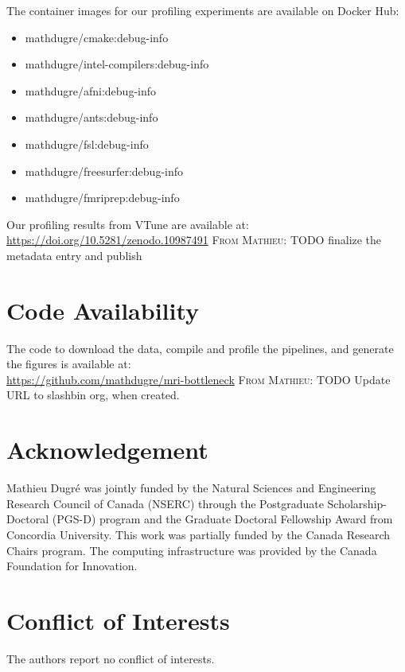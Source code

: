 \documentclass[conference]{IEEEtran}
\newcommand{\MD}[1]{\color{magenta}\textsc{From Mathieu: }#1\color{black}}
\begin{document}
The container images for our profiling experiments are available on Docker Hub:
\begin{itemize}
	\item mathdugre/cmake:debug-info
	\item mathdugre/intel-compilers:debug-info
	\item mathdugre/afni:debug-info
	\item mathdugre/ants:debug-info
	\item mathdugre/fsl:debug-info
	\item mathdugre/freesurfer:debug-info
	\item mathdugre/fmriprep:debug-info
\end{itemize}
	
Our profiling results from VTune are available at:
\\\href{https://doi.org/10.5281/zenodo.10987491}{https://doi.org/10.5281/zenodo.10987491}
\MD{TODO finalize the metadata entry and publish}

\section{Code Availability}
\label{sec:code-availability}
The code to download the data, compile and profile the pipelines, and generate the figures is available at:
\\\href{https://github.com/mathdugre/mri-bottleneck}{https://github.com/mathdugre/mri-bottleneck}
\MD{TODO Update URL to slashbin org, when created.}
													
\section*{Acknowledgement}
Mathieu Dugr\'e was jointly funded by the Natural Sciences and Engineering Research Council of Canada (NSERC) through the Postgraduate Scholarship-Doctoral (PGS-D) program and the Graduate Doctoral Fellowship Award from Concordia University. This work was partially funded by the Canada Research Chairs program. The computing infrastructure was provided by the Canada Foundation for Innovation. 
													
\section*{Conflict of Interests}
The authors report no conflict of interests.
													

% 

													
\end{document}
